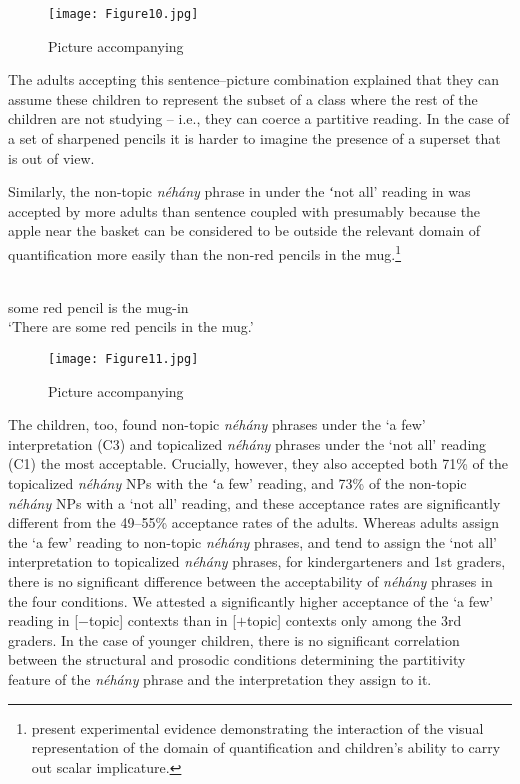 \documentclass[output=paper]{langscibook}
\begin{document}
\begin{figure}
    \centering
    \texttt{[image: Figure10.jpg]}
    \caption{Picture accompanying }
    \label{kis-zet:children reading}
\end{figure}

The adults accepting this sentence–picture combination explained that they can assume these children to represent the subset of a class where the rest of the children are not studying – i.e., they can coerce a partitive reading. In the case of a set of sharpened pencils it is harder to imagine the presence of a superset that is out of view. 

Similarly, the non-topic \textit{néhány} phrase in  under the ʻnot all’ reading in  was accepted by more adults than sentence  coupled with  presumably because the apple near the basket can be considered to be outside the relevant domain of quantification more easily than the non-red pencils in the mug.\footnote{\citet{ekisszt18} present experimental evidence demonstrating the interaction of the visual representation of the domain of quantification and children’s ability to carry out scalar implicature.} 

\ea\label{kis-zet:piros ceruza}
\\  
    {} some red pencil is the mug-in \\ 
\glt ‘There are some red pencils in the mug.’
\z


\begin{figure}
    \centering
    \texttt{[image: Figure11.jpg]}
    \caption{Picture accompanying }
    \label{kis-zet:pencils}
\end{figure}

The children, too, found non-topic \textit{néhány} phrases under the `a few' interpretation (C3) and topicalized \textit{néhány} phrases under the `not all' reading (C1) the most acceptable. Crucially, however, they also accepted both 71\% of the topicalized \textit{néhány} NPs with the ʻa few’ reading, and 73\% of the non-topic \textit{néhány} NPs with a `not all' reading, and these acceptance rates are significantly different from the 49--55\% acceptance rates of the adults. Whereas adults assign the `a few' reading to non-topic \textit{néhány} phrases,
and tend to assign the `not all' interpretation to topicalized \textit{néhány}
phrases, for kindergarteners and 1st graders, there is no significant difference between the acceptability of \textit{néhány} phrases in the four conditions. We attested a significantly higher acceptance of the `a few' reading in [$-$topic] contexts than in [$+$topic] contexts only among the 3rd graders. In the case of younger children, there is no significant correlation between the structural and prosodic conditions determining the partitivity feature of the \textit{néhány} phrase and the interpretation they assign to it. 
\end{document}
